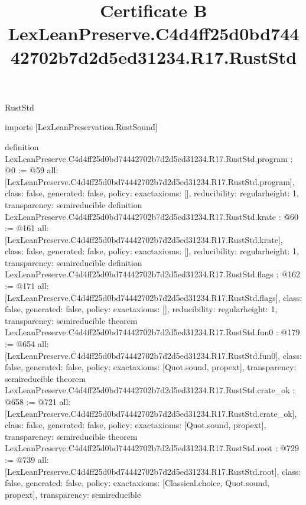 \begin{lexlean}{RustStd}
\title{Certificate B LexLeanPreserve.C4d4ff25d0bd74442702b7d2d5ed31234.R17.RustStd}
\begin{coremodule}
imports [LexLeanPreservation.RustSound]

definition LexLeanPreserve.C4d4ff25d0bd74442702b7d2d5ed31234.R17.RustStd.program : @0 := @59 {
  all: [LexLeanPreserve.C4d4ff25d0bd74442702b7d2d5ed31234.R17.RustStd.program],
  class: false,
  generated: false,
  policy: exact{axioms: []},
  reducibility: regular{height: 1},
  transparency: semireducible
}
definition LexLeanPreserve.C4d4ff25d0bd74442702b7d2d5ed31234.R17.RustStd.krate : @60 := @161 {
  all: [LexLeanPreserve.C4d4ff25d0bd74442702b7d2d5ed31234.R17.RustStd.krate],
  class: false,
  generated: false,
  policy: exact{axioms: []},
  reducibility: regular{height: 1},
  transparency: semireducible
}
definition LexLeanPreserve.C4d4ff25d0bd74442702b7d2d5ed31234.R17.RustStd.flags : @162 := @171 {
  all: [LexLeanPreserve.C4d4ff25d0bd74442702b7d2d5ed31234.R17.RustStd.flags],
  class: false,
  generated: false,
  policy: exact{axioms: []},
  reducibility: regular{height: 1},
  transparency: semireducible
}
theorem LexLeanPreserve.C4d4ff25d0bd74442702b7d2d5ed31234.R17.RustStd.fun0 : @179 := @654 {
  all: [LexLeanPreserve.C4d4ff25d0bd74442702b7d2d5ed31234.R17.RustStd.fun0],
  class: false,
  generated: false,
  policy: exact{axioms: [Quot.sound, propext]},
  transparency: semireducible
}
theorem LexLeanPreserve.C4d4ff25d0bd74442702b7d2d5ed31234.R17.RustStd.crate_ok : @658 := @721 {
  all: [LexLeanPreserve.C4d4ff25d0bd74442702b7d2d5ed31234.R17.RustStd.crate_ok],
  class: false,
  generated: false,
  policy: exact{axioms: [Quot.sound, propext]},
  transparency: semireducible
}
theorem LexLeanPreserve.C4d4ff25d0bd74442702b7d2d5ed31234.R17.RustStd.root : @729 := @739 {
  all: [LexLeanPreserve.C4d4ff25d0bd74442702b7d2d5ed31234.R17.RustStd.root],
  class: false,
  generated: false,
  policy: exact{axioms: [Classical.choice, Quot.sound, propext]},
  transparency: semireducible
}


\end{coremodule}
\end{lexlean}
